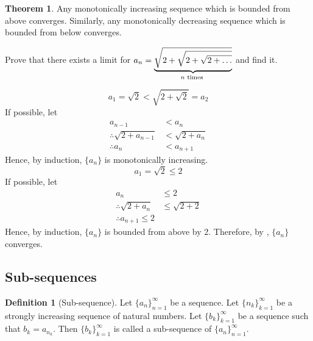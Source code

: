 \documentclass[fleqn, a4paper, 8pt, twoside]{amsart}
\theoremstyle{definition}
\theoremstyle{bluedefinition}
\newtheorem{definition}{Definition}
\theoremstyle{redtheorem}
\newtheorem{theorem}{Theorem}
\begin{document}
\begin{multicols}{2}
\begin{spacing}{0.7}
\begin{theorem}
	Any monotonically increasing sequence which is bounded from above converges.
	Similarly, any monotonically decreasing sequence which is bounded from below converges.
	\label{monotonicity and boundedness implies convergence}
\end{theorem}

\begin{question}
	Prove that there exists a limit for $a_n = \underbrace{\sqrt{2 + \sqrt{2 + \sqrt{2 + \dots}}}}_{n \textnormal{ times }}$ and find it.
\end{question}

\begin{solution}[print]
	\begin{equation*}
		a_1 = \sqrt{2} < \sqrt{2 + \sqrt{2}} = a_2
	\end{equation*}
	If possible, let
	\begin{align*}
		a_{n - 1} &< a_n\\
		\therefore \sqrt{2 + a_{n - 1}} &< \sqrt{2 + a_n}\\
		\therefore a_n &< a_{n + 1}
	\end{align*}
	Hence, by induction, $\{a_n\}$ is monotonically increasing.
	~\\
	\begin{equation*}
		a_1 = \sqrt{2} \leq 2
	\end{equation*}
	If possible, let
	\begin{align*}
		a_n &\leq 2\\
		\therefore \sqrt{2 + a_n} &\leq \sqrt{2 + 2}\\
		\therefore a_{n + 1} \leq 2
	\end{align*}
	Hence, by induction, $\{a_n\}$ is bounded from above by 2.
	Therefore, by , $\{a_n\}$ converges.
\end{solution}

\subsection{Sub-sequences}

\begin{definition}[Sub-sequence]
	Let $\{a_n\}_{n = 1} ^{\infty}$ be a sequence.
	Let $\{n_k\}_{k = 1}^{\infty}$ be a strongly increasing sequence of natural numbers.
	Let $\{b_k\}_{k = 1}^{\infty}$ be a sequence such that $b_k = a_{n_k}$.
	Then $\{b_k\}_{k = 1}^{\infty}$ is called a sub-sequence of $\{a_n\}_{n = 1}^{\infty}$.
\end{definition}


\end{spacing}
\end{multicols}
\end{document}
